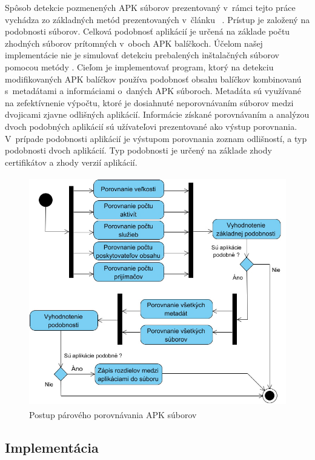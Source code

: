 Spôsob detekcie pozmenených APK súborov prezentovaný v~rámci tejto práce vychádza zo základných metód prezentovaných v~článku ~\cite{Zhauniarovich2014}. Prístup je založený na podobnosti súborov. Celková podobnosť aplikácií je určená na základe počtu zhodných súborov prítomných v~oboch APK balíčkoch. Účelom našej implementácie nie je simulovať detekciu prebalených inštalačných súborov pomocou metódy . Cieľom je implementovať program, ktorý na detekciu modifikovaných APK balíčkov používa podobnosť obsahu balíčkov kombinovanú s~metadátami a informáciami o~daných APK súboroch. Metadáta sú využívané na zefektívnenie výpočtu, ktoré je dosiahnuté neporovnávaním súborov medzi dvojicami zjavne odlišných aplikácií. Informácie získané porovnávaním a analýzou dvoch podobných aplikácií sú užívateľovi prezentované ako výstup porovnania. V~prípade podobnosti aplikácií je výstupom porovnania zoznam odlišností, a typ podobnosti dvoch aplikácií. Typ podobnosti je určený na základe zhody certifikátov a zhody verzií aplikácií. 
\begin{figure}[htb]
  \begin{center}
    \includegraphics[height=10cm]{images/diagram.jpg}
  \end{center}
  \caption{Postup párového porovnávania APK súborov}
  \label{fig:compareFlow}
\end{figure}
\subsection{Implementácia}

